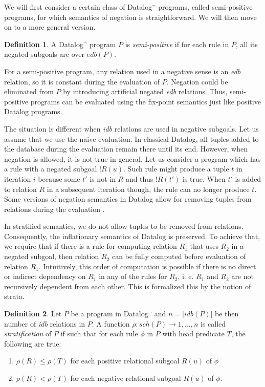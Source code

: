 \documentclass{pracamgr}
\theoremstyle{plain}
\theoremstyle{definition}
\newtheorem{defn}{Definition}[section]
\theoremstyle{remark}
\newcommand{\datalogneg}{Datalog$^{\neg}$ }
\begin{document}
We will first consider a certain class of \datalogneg programs, called semi-positive programs, for which semantics of negation is straightforward. We will then move on to a more general version.

\begin{defn}
A \datalogneg program $P$ is \emph{semi-positive} if for each rule in $P$, all its negated subgoals are over $edb(P)$.
\end{defn}

For a semi-positive program, any relation used in a negative sense is an \emph{edb} relation, so it is constant during the evaluation of $P$. Negation could be eliminated from $P$ by introducing artificial negated \emph{edb} relations. Thus, semi-positive programs can be evaluated using the fix-point semantics just like positive Datalog programs.

The situation is different when \emph{idb} relations are used in negative subgoals. Let us assume that we use the naive evaluation. In classical Datalog, all tuples added to the database during the evaluation remain there until its end. However, when negation is allowed, it is not true in general. Let us consider a program which has a rule with a negated subgoal $!R(u)$. Such rule might produce a tuple $t$ in iteration $i$ because some $t'$ is not in $R$ and thus $!R(t')$ is true. When $t'$ is added to relation $R$ in a subsequent iteration though, the rule can no longer produce $t$. Some versions of negation semantics in Datalog allow for removing tuples from relations during the evaluation \cite{fod}.

In stratified semantics, we do not allow tuples to be removed from relations. Consequently, the inflationary semantics of Datalog is preserved. To achieve that, we require that if there is a rule for computing relation $R_1$ that uses $R_2$ in a negated subgoal, then relation $R_2$ can be fully computed before evaluation of relation $R_1$. Intuitively, this order of computation is possible if there is no direct or indirect dependency on $R_1$ in any of the rules for $R_2$, i. e. $R_1$ and $R_2$ are not recursively dependent from each other. This is formalized this by the notion of strata.

\begin{defn}
Let $P$ be a program in \datalogneg and $n = |idb(P)|$ be then number of \emph{idb} relations in $P$. A function $\rho : sch(P) \to {1, . . . , n}$ is called \emph{stratification} of $P$ if such that for each rule $\phi$ in $P$ with head predicate $T$, the following are true: 

\begin{enumerate}
\item $\rho(R) \le \rho(T)$ for each positive relational subgoal $R(u)$ of $\phi$
\item $\rho(R) < \rho(T)$ for each negative relational subgoal $R(u)$ of $\phi$.
\end{enumerate}
\end{defn}
\end{document}
